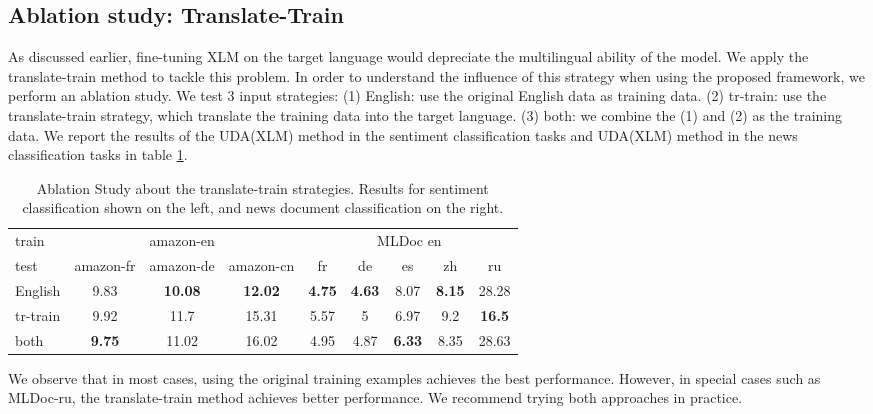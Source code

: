 \documentclass{article} \usepackage{iclr2020_conference,times}
\begin{document}
\subsection{Ablation study: Translate-Train}
\label{app:ablationtranslate}

As discussed earlier, fine-tuning XLM on the target language would depreciate the multilingual ability of the model. We apply the translate-train method to tackle this problem. In order to understand the influence of this strategy when using the proposed framework, we perform an ablation study. We test 3 input strategies: (1) English: use the original English data as training data. (2) tr-train: use the translate-train strategy, which translate the training data into the target language. (3) both: we combine the (1) and (2) as the training data. We report the results of the UDA(XLM) method in the sentiment classification tasks and UDA(XLM) method in the news classification tasks in table \ref{tab:trt-lang}.

\begin{table}[!ht]
\centering
    \begin{tabular}{l|ccc||ccccc}
    \toprule
    train &           & amazon-en      &           &      \multicolumn{5}{c}{MLDoc en}       \\
    test  & amazon-fr & amazon-de & amazon-cn & fr   & de   & es   & zh   & ru    \\
    \midrule
    English   & 9.83      & \textbf{10.08}     & \textbf{12.02}     & \textbf{4.75} & \textbf{4.63} & 8.07 & \textbf{8.15} & 28.28 \\
    tr-train   & 9.92      & 11.7      & 15.31     & 5.57 & 5    & 6.97 & 9.2  & \textbf{16.5}  \\
    both  & \textbf{9.75}      & 11.02     & 16.02     & 4.95 & 4.87 & \textbf{6.33} & 8.35 & 28.63 \\
    \bottomrule
    \end{tabular}
    \caption{Ablation Study about the translate-train strategies. Results for sentiment classification shown on the left, and news document classification on the right.}
    \label{tab:trt-lang}
\end{table}

We observe that in most cases, using the original training examples achieves the best performance. However, in special cases such as MLDoc-ru, the translate-train method achieves better performance. We recommend trying both approaches in practice. 
\end{document}

